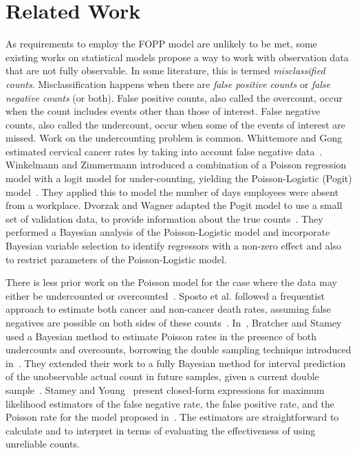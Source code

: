 
\section{Related Work}
\label{sec:related}


As requirements to employ the FOPP model are unlikely to be met, some existing works on statistical models propose a way to work with observation data that are not fully observable. In some literature, this is termed \emph{misclassified counts}. Misclassification happens when there are \emph{false positive counts} or \emph{false negative counts} (or both). False positive counts, also called the overcount, occur when the count includes events other than those of interest. False negative counts, also called the undercount, occur when some of the events of interest are missed. Work on the undercounting problem is common. Whittemore and Gong estimated cervical cancer rates by taking into account false negative data~\cite{whittemore1991}. Winkelmann and Zimmermann introduced a combination of a Poisson regression model with a logit model for under-counting, yielding the Poisson-Logistic (Pogit) model~\cite{winkelmann1993poisson}. They applied this to model the number of days employees were absent from a workplace. Dvorzak and Wagner adapted the Pogit model to use a small set of validation data, to provide information about the true counts~\cite{dvorzak2016}. They performed a Bayesian analysis of the Poisson-Logistic model and incorporate Bayesian variable selection to identify regressors with a non-zero effect and also to restrict parameters of the Poisson-Logistic model.

There is less prior work on the Poisson model for the case where the data may either be undercounted or overcounted~\cite{sposto1992, bratcher2002, bratcher2004, stamey2005}. Sposto et al. followed a frequentist approach to estimate both cancer and non-cancer death rates, assuming false negatives are possible on both sides of these counts~\cite{sposto1992}. In~\cite{bratcher2002}, Bratcher and Stamey used a Bayesian method to estimate Poisson rates in the presence of both undercounts and overcounts, borrowing the double sampling technique introduced in~\cite{Tenenbein1970}. They extended their work to a fully Bayesian method for interval prediction of the unobservable actual count in future samples, given a current double sample~\cite{bratcher2004}. Stamey and Young~\cite{stamey2005} present closed-form expressions for maximum likelihood estimators of the false negative rate, the false positive rate, and the Poisson rate for the model proposed in~\cite{bratcher2002}. The estimators are straightforward to calculate and to interpret in terms of evaluating the effectiveness of using unreliable counts.

